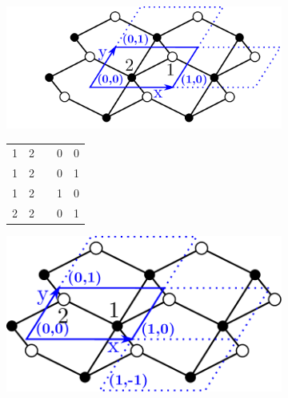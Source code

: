 \documentclass[main.tex]{subfiles}
\begin{document}
\begin{figure}[t]
\begin{subfigure}[b]{0.35\linewidth}
	\end{subfigure}%
	\begin{subfigure}[b]{0.35\linewidth}
		\hspace{-2em}\includegraphics[width=1\linewidth]{figures/topology/cells_12.pdf}
		
		\centering\begin{tabular}{ccccc}
			1&2&&0&0\\
			1&2&&0&1\\
			1&2&&1&0\\
			2&2&&0&1
		\end{tabular}
		
	\end{subfigure}
	\begin{subfigure}[b]{0.35\linewidth}
		\hspace{1.5em}
		\hspace{-2em}\includegraphics[width=0.8\linewidth]{figures/topology/cells_orig.pdf}
		\vspace{1em}
		

\end{subfigure}
\end{figure}
\end{document}
